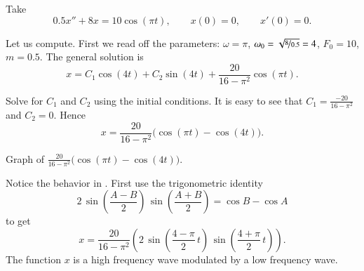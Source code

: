 \documentclass[12pt]{book}
\begin{document}
\begin{example}
Take
\begin{equation*}
0.5 x'' + 8 x = 10 \cos (\pi t), \qquad x(0)=0, \qquad x'(0)=0 .
\end{equation*}

Let us compute.  First we read off the parameters:
$\omega = \pi$, $\omega_0 = \sqrt{\nicefrac{8}{0.5}} = 4$, $F_0 = 10$,
$m=0.5$.  The general solution is
\begin{equation*}
x = C_1 \cos (4 t) + C_2 \sin (4 t) +
\frac{20}{16 - \pi^2} \cos (\pi t) .
\end{equation*}

Solve for $C_1$ and $C_2$ using the initial conditions.
It is easy to see that
$C_1 = \frac{-20}{16 - \pi^2}$ and $C_2 = 0$.  Hence
\begin{equation*}
x = 
\frac{20}{16 - \pi^2} \bigl( \cos (\pi t)- \cos (4 t) \bigr) .
\end{equation*}

\begin{diffyfloatingfigurepdfonly}{3.1in}
\capstart
\begin{center}
\caption[Graph of  behavior.]{Graph of
$\frac{20}{16 - \pi^2} \bigl( \cos (\pi t)- \cos (4 t) \bigr)$.\label{3.6:beatingfig}}
\end{center}
\end{diffyfloatingfigurepdfonly}

Notice the  behavior
in .  First
use the 
trigonometric identity
\begin{equation*}
2\,\sin \left( \frac{A-B}{2} \right) \,\sin \left( \frac{A+B}{2} \right) =
\cos B -\cos A 
\end{equation*}
to get 
\begin{equation*}
x = 
\frac{20}{16 - \pi^2} \left( 2 \, \sin \left(\frac{4-\pi}{2} \, t \right)
\,\sin \left( \frac{4+\pi}{2}\, t \right) \right) .
\end{equation*}
The function $x$ is a high frequency wave modulated by a low frequency
wave.
\end{example}
\end{document}
